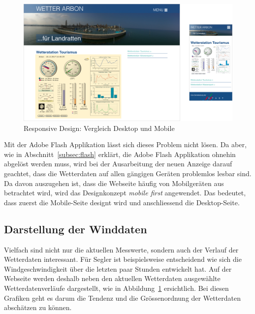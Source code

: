 \begin{figure}[h!]
	\centering
	\includegraphics[width=1\linewidth]{img/responsive}
	\caption{Responsive Design: Vergleich Desktop und Mobile}
	\label{img:responsive}
\end{figure}


\noindent
Mit der Adobe Flash Applikation lässt sich dieses Problem nicht lösen. Da aber, wie in Abschnitt~\ref{subsec:flash} erklärt, die Adobe Flash Applikation ohnehin abgelöst werden muss, wird bei der Ausarbeitung der neuen Anzeige darauf geachtet, dass die Wetterdaten auf allen gängigen Geräten problemlos lesbar sind. Da davon auszugehen ist, dass die Webseite häufig von Mobilgeräten aus betrachtet wird, wird das Designkonzept \textit{mobile first} angewendet. Das bedeutet, dass zuerst die Mobile-Seite designt wird und anschliessend die Desktop-Seite.


\subsection{Darstellung der Winddaten}
Vielfach sind nicht nur die aktuellen Messwerte, sondern auch der Verlauf der Wetterdaten interessant. Für Segler ist beispielsweise entscheidend wie sich die Windgeschwindigkeit über die letzten paar Stunden entwickelt hat. Auf der Webseite werden deshalb neben den aktuellen Wetterdaten ausgewählte Wetterdatenverläufe dargestellt, wie in Abbildung~\ref{img:responsive} ersichtlich. Bei diesen Grafiken geht es darum die Tendenz und die Grössenordnung der Wetterdaten abschätzen zu können.
\newline

